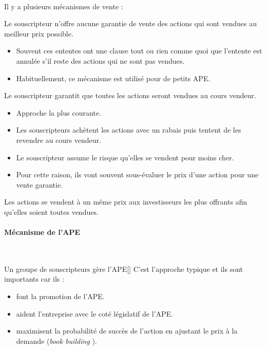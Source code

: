 \documentclass[10pt, french]{article}
\begin{document}
\begin{multicols*}{2}
\

Il y a plusieurs mécanismes de vente :

\begin{definitionNOHFILLsub}
Le souscripteur n'offre aucune garantie de vente des actions qui sont vendues au meilleur prix possible.
\begin{itemize}
	\item	Souvent ces ententes ont une clause tout ou rien comme quoi que l'entente est annulée s'il reste des actions qui ne sont pas vendues.
	\item	Habituellement, ce mécanisme est utilisé pour de petits APE.
\end{itemize}
\end{definitionNOHFILLsub}

\begin{definitionNOHFILLsub}
Le souscripteur garantit que toutes les actions seront vendues au cours vendeur.
\begin{itemize}
	\item	Approche la plus courante.
	\item	Les souscripteurs achètent les actions avec un rabais puis tentent de les revendre au cours vendeur.
	\item	Le souscripteur assume le risque qu'elles se vendent pour moins cher.
	\item	Pour cette raison, ils vont souvent sous-évaluer le prix d'une action pour une vente garantie.
\end{itemize}
\end{definitionNOHFILLsub}

\begin{definitionNOHFILLsub}
Les actions se vendent à un même prix aux investisseurs les plus offrants afin qu’elles soient toutes vendues.
\end{definitionNOHFILLsub}


\paragraph{Mécanisme de l'APE}\
\begin{definitionGENERAL}{Un groupe de souscripteurs gère l'APE}[]
C'est l'approche typique et ils sont importants car ils :
\begin{itemize}
	\item	font la promotion de l'APE.
	\item	aident l'entreprise avec le coté législatif de l'APE.
	\item	maximisent la probabilité de succès de l'action en ajustant le prix à la demande (\og \textit{book building} \fg{}).
\end{itemize}
\end{definitionGENERAL}


\end{multicols*}
\end{document}
